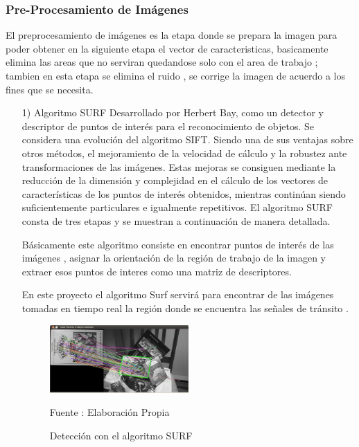 \documentclass[a4paper, 12pt]{article}
\begin{document}
\subsubsection{Pre-Procesamiento de Imágenes}
El preprocesamiento de imágenes es la etapa donde se prepara la imagen para poder obtener en la siguiente etapa el vector de caracteristicas, basicamente elimina las areas que no serviran quedandose solo con el area de trabajo ; tambien en esta etapa se elimina el ruido , se corrige la imagen de acuerdo a los fines que se necesita.\par
\begin{enumerate}
\item[1)] Algoritmo SURF
\vskip 0.3cm
Desarrollado por Herbert Bay, como un detector y descriptor de puntos de interés para el reconocimiento de objetos. Se considera una evolución del algoritmo SIFT. Siendo una de sus ventajas sobre otros métodos, el mejoramiento de la velocidad de cálculo y la robustez ante transformaciones de las imágenes. Estas mejoras se consiguen mediante la reducción de la dimensión y complejidad en el cálculo de los vectores de características de los puntos de interés obtenidos, mientras continúan siendo suficientemente particulares e igualmente repetitivos. El algoritmo SURF consta de tres etapas y se muestran a continuación de manera detallada.\citep{caiza2016diseno} \par

Básicamente este algoritmo consiste en encontrar puntos de interés de las imágenes , asignar la orientación de la región de trabajo de la imagen y extraer esos puntos de interes como una matriz de descriptores.\par
En este proyecto el algoritmo Surf servirá para encontrar de las imágenes tomadas en tiempo real la región donde se encuentra las señales de tránsito .\par
\begin{figure}[ht]
\begin{center}
\includegraphics[width=0.5\textwidth]{surf}
\end{center}
\begin{center}
\caption{\small{Detección con el algoritmo SURF}}
{\small{Fuente : Elaboración Propia}}
\end{center}
\end{figure}
\vskip 0.3cm


\end{enumerate}
\end{document}
